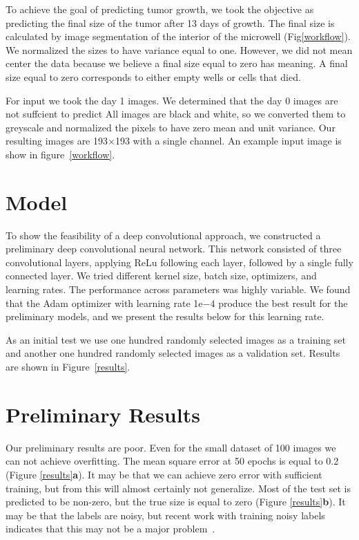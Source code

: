 \documentclass[10pt,twocolumn,letterpaper]{article}
\begin{document}
To achieve the goal of predicting tumor growth, we took the objective as predicting the final size of the tumor after 13 days of growth.  The final size is calculated by image segmentation of the interior of the microwell (Fig\ref{workflow}).  We normalized the sizes to have variance equal to one.  However, we did not mean center the data because we believe a final size equal to zero has meaning.  A final size equal to zero corresponds to either empty wells or cells that died.  





For input we took the day 1 images.  We determined that the day 0 images are not suffcient to predict  All images are black and white, so we converted them to greyscale and normalized the pixels to have zero mean and unit variance.  Our resulting images are 193$\times$193 with a single channel.   An example input image is show in figure~\ref{workflow}.







\section{Model}




To show the feasibility of a deep convolutional approach, we constructed a preliminary deep convolutional neural network. This network consisted of three convolutional layers, applying ReLu following each layer, followed by a single fully connected layer. We tried different kernel size, batch size, optimizers, and learning rates.  The performance across parameters was highly variable.  We found that the Adam optimizer with learning rate 1e$-4$ produce the best result for the preliminary models, and we present the results below for this learning rate.

As an initial test we use one hundred randomly selected images as a training set and another one hundred randomly selected images as a validation set.  Results are shown in Figure~\ref{results}.





\section{Preliminary Results}

Our preliminary results are poor.  Even for the small dataset of 100 images we can not achieve overfitting.  The mean square error at 50 epochs is equal to 0.2 (Figure \ref{results}\textbf{a}).  It may be that we can achieve zero error with sufficient training, but from this will almost certainly not generalize.     Most of the test set is predicted to be non-zero, but the true size is equal to zero (Figure \ref{results}\textbf{b}).  It may be that the labels are noisy, but recent work with training noisy labels indicates that this may not be a major problem~\cite{xue2019robust}.
\end{document}
